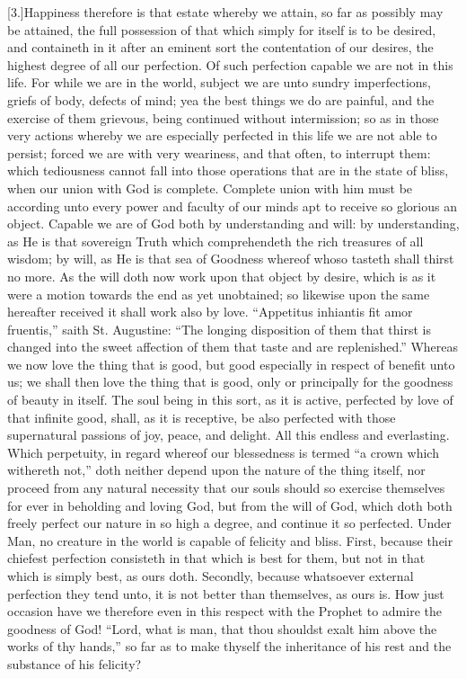 [3.]Happiness therefore is that estate whereby we attain, so far as possibly may be attained, the full possession of that which simply for itself is to be desired, and containeth in it after an eminent sort the contentation of our desires, the highest degree of all our perfection. Of such perfection capable we are not in this life. For while we are in the world, subject we are unto sundry imperfections, griefs of body, defects of mind; yea the best things we do are painful, and the exercise of them grievous, being continued without intermission; so as in those very actions whereby we are especially perfected in this life we are not able to persist; forced we are with very weariness, and that often, to interrupt them: which tediousness cannot fall into those operations that are in the state of bliss, when our union with God is complete. Complete union with him must be according unto every power and faculty of our minds apt to receive so glorious an object. Capable we are of God both by understanding and will: by understanding, as He is that sovereign Truth which comprehendeth the rich treasures of all wisdom; by will, as He is that sea of Goodness whereof whoso tasteth  shall thirst no more. As the will doth now work upon that object by desire, which is as it were a motion towards the end as yet unobtained; so likewise upon the same hereafter received it shall work also by love. “Appetitus inhiantis fit amor fruentis,” saith St. Augustine: “The longing disposition of them that thirst is changed into the sweet affection of them that taste and are replenished.” Whereas we now love the thing that is good, but good especially in respect of benefit unto us; we shall then love the thing that is good, only or principally for the goodness of beauty in itself. The soul being in this sort, as it is active, perfected by love of that infinite good, shall, as it is receptive, be also perfected with those supernatural passions of joy, peace, and delight. All this endless and everlasting. Which perpetuity, in regard whereof our blessedness is termed “a crown which withereth not,” doth neither depend upon the nature of the thing itself, nor proceed from any natural necessity that our souls should so exercise themselves for ever in beholding and loving God, but from the will of God, which doth both freely perfect our nature in so high a degree, and continue it so perfected. Under Man, no creature in the world is capable of felicity and bliss. First, because their chiefest perfection consisteth in that which is best for them, but not in that which is simply best, as ours doth. Secondly, because whatsoever external perfection they tend unto, it is not better than themselves, as ours is. How just occasion have we therefore even in this respect with the Prophet to admire the goodness of God! “Lord, what is man, that thou shouldst exalt him above the works of thy hands,” so far as to make thyself the inheritance of his rest and the substance of his felicity?

